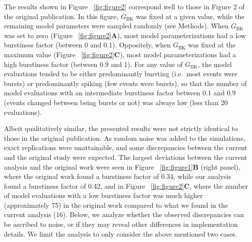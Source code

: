\documentclass[10pt,a4paper,onecolumn]{article}
\begin{document}
The results shown in Figure ~\ref{fig:figure2} correspond well to those
in Figure 2 of the original publication. In this figure,
\(G_\mathrm{BK}\) was fixed at a given value, while the remaining model
parameters were sampled randomly (see Methods). When \(G_\mathrm{BK}\)
was set to zero (Figure ~\ref{fig:figure2}\textbf{A}), most model
parameterizations had a low burstiness factor (between 0 and 0.1).
Oppositely, when \(G_\mathrm{BK}\) was fixed at the maximum value
(Figure ~\ref{fig:figure2}\textbf{C}), most model parameterizations had
a high burstiness factor (between 0.9 and 1). For any value of
\(G_\mathrm{BK}\), the model evaluations tended to be either
predominantly bursting (i.e.~most events were bursts) or predominantly
spiking (few events were bursts), so that the number of model
evaluations with an intermediate burstiness factor between 0.1 and 0.9
(events changed between being bursts or not) was always low (less than
20 evaluations).

Albeit qualitatively similar, the presented results were not strictly
identical to those in the original publication. As random noise was
added to the simulations, exact replications were unattainable, and some
discrepancies between the current and the original study were expected.
The largest deviations between the current analysis and the original
work were seen in Figure ~\ref{fig:figure1}\textbf{B} (right panel),
where the original work found a burstiness factor of 0.34, while our
analysis found a burstiness factor of 0.42, and in Figure
~\ref{fig:figure2}\textbf{C}, where the number of model evaluations with
a low burstiness factor was much higher (approximately 75) in the
original work compared to what we found in the current analysis (16).
Below, we analyze whether the observed discrepancies can be ascribed to
noise, or if they may reveal other differences in implementation
details. We limit the analysis to only consider the above mentioned two
cases.
\end{document}
